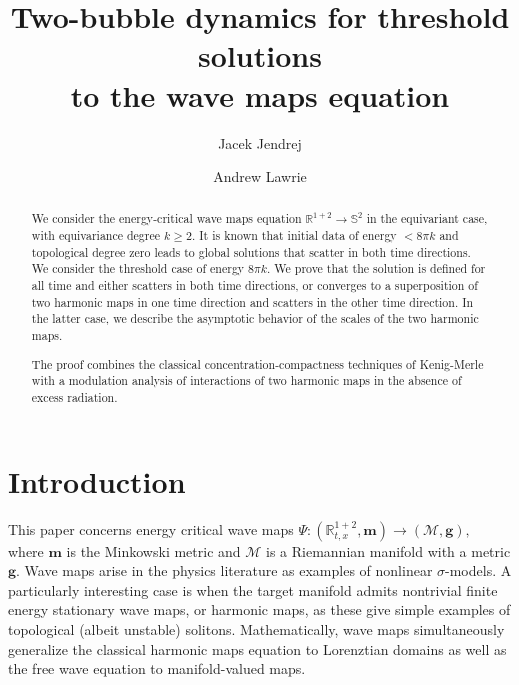 \documentclass[10pt,reqno]{amsart}
\def\bR {\mathbb{R}}
\def\bS {\mathbb{S}}
\newcommand{\red}[1]{\textcolor{red}{#1}}
\newcommand{\Red}[1]{{\color{red} #1}}
\newcommand{\M}{\mathcal{M}}
\newcommand{\R}{\mathbb{R}}
\newcommand{\g}{\mathbf{g}}
\newcommand{\m}{\mathbf{m}}
\numberwithin{equation}{section}
\theoremstyle{remark}
\newcommand{\0}{\emptyset}
\begin{document}
\title[Two-bubble dynamics for wave maps]{Two-bubble dynamics for threshold solutions \\ to the  wave maps equation}
\author{Jacek Jendrej}
\author{Andrew Lawrie}


\begin{abstract}
We consider the energy-critical wave maps equation $\bR^{1+2} \to \bS^2$
in the equivariant case, with equivariance degree $k \geq 2$.
It is known that initial data of energy $< 8\pi k$ and topological degree zero
leads to global solutions that scatter in both time directions.
We consider the threshold case of energy $8 \pi k $.
We prove that the solution is defined for all time
and either scatters in both time directions,
or converges to a superposition of two harmonic maps in one time direction
and scatters in the other time direction. In the latter case, we describe
the asymptotic behavior of the scales of the two harmonic maps.

The proof combines the classical concentration-compactness techniques of Kenig-Merle
with a modulation analysis of interactions of two harmonic maps in the absence of excess radiation.

%
\end{abstract} 


\maketitle



\section{Introduction}

This paper concerns energy critical wave maps
$
\Psi: (\R^{1+2}_{t, x}, \m) \to (\mathcal{M}, \g),
$
where  $\m$ is the Minkowski metric and $\M$ is a Riemannian manifold with a metric $\g$. Wave maps arise in the physics literature as examples of nonlinear $\sigma$-models. A particularly  interesting case is when the target manifold admits nontrivial finite energy stationary wave maps, or harmonic maps, as these give simple examples of topological (albeit unstable) solitons.  Mathematically, wave maps simultaneously generalize the classical harmonic maps equation to Lorenztian domains as well as the free wave equation to manifold-valued maps. 
\end{document}
